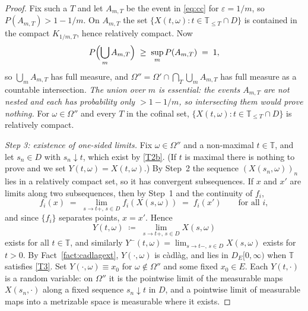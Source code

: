 \documentclass[11pt,a4paper]{article}
\theoremstyle{plain}
\theoremstyle{definition}
\theoremstyle{remark}
\newcommand{\T}{\mathbb{T}}                     %
\newcommand{\DE}{D_E[0,\infty)}
\begin{document}
\begin{proof}
  Fix such a $T$ and let $A_{m,T}$ be the event in \eqref{eq:cc} for
  $\varepsilon = 1/m$, so $P(A_{m,T}) > 1 - 1/m$.  On $A_{m,T}$ the set
  $\{X(t,\omega) : t \in \T_{\leq T} \cap D\}$ is contained in the compact
  $K_{1/m,T}$, hence relatively compact.  Now
  \[
    P\Bigl( \bigcup_m A_{m,T} \Bigr) \;\geq\; \sup_m P(A_{m,T}) \;=\; 1 ,
  \]
  so $\bigcup_m A_{m,T}$ has full measure, and
  $\Omega'' = \Omega' \cap \bigcap_T \bigcup_m A_{m,T}$ has full measure as a
  countable intersection.  \emph{The union over $m$ is essential: the events
  $A_{m,T}$ are not nested and each has probability only $> 1-1/m$, so
  intersecting them would prove nothing.}  For $\omega \in \Omega''$ and every $T$
  in the cofinal set, $\{X(t,\omega) : t \in \T_{\leq T} \cap D\}$ is relatively
  compact.

  \emph{Step 3: existence of one-sided limits.}
  Fix $\omega \in \Omega''$ and a non-maximal $t \in \T$, and let $s_n \in D$ with
  $s_n \downarrow t$, which exist by \eqref{T2b}.  (If $t$ is maximal there is nothing
  to prove and we set $Y(t,\omega) = X(t,\omega)$.)  By Step~2 the sequence
  $(X(s_n,\omega))_n$ lies in a relatively compact set, so it has convergent
  subsequences.  If $x$ and $x'$ are limits
  along two subsequences, then by Step~1 and the continuity of $f_i$,
  \[
    f_i(x) \;=\; \lim_{s \to t+,\, s \in D} f_i(X(s,\omega)) \;=\; f_i(x')
    \qquad \text{for all } i ,
  \]
  and since $\{f_i\}$ separates points, $x = x'$.  Hence
  \begin{equation}
    \label{eq:absreg2}
    Y(t,\omega) \;\coloneqq\; \lim_{s \to t+,\, s \in D} X(s,\omega)
  \end{equation}
  exists for all $t \in \T$, and similarly
  $Y^-(t,\omega) = \lim_{s \to t-,\, s \in D} X(s,\omega)$ exists for $t > 0$.
  By Fact~\ref{fact:cadlagext}, $Y(\cdot,\omega)$ is c\`adl\`ag, and lies in
  $\DE$ when $\T$ satisfies \eqref{T3}.  Set $Y(\cdot,\omega) \equiv x_0$ for
  $\omega \notin \Omega''$ and some fixed $x_0 \in E$.  Each $Y(t,\cdot)$ is a
  random variable: on $\Omega''$ it is the pointwise limit of the measurable maps
  $X(s_n,\cdot)$ along a fixed sequence $s_n \downarrow t$ in $D$, and a pointwise
  limit of measurable maps into a metrizable space is measurable where it
  exists.


\end{proof}
\end{document}

